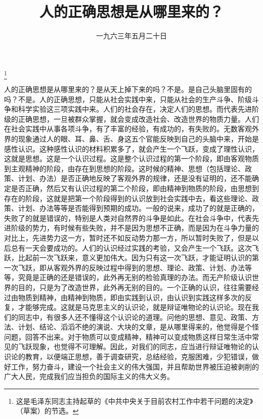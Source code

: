 
\title{人的正确思想是从哪里来的？}
\date{一九六三年五月二十日}
\thanks{这是毛泽东同志主持起草的《中共中央关于目前农村工作中若干问题的决定》（草案）的节选。}
\maketitle


人的正确思想是从哪里来的？是从天上掉下来的吗？不是。是自己头脑里固有的吗？不是。人的正确思想，只能从社会实践中来，只能从社会的生产斗争、阶级斗争和科学实验这三项实践中来。人们的社会存在，决定人们的思想。而代表先进阶级的正确思想，一旦被群众掌握，就会变成改造社会、改造世界的物质力量。人们在社会实践中从事各项斗争，有了丰富的经验，有成功的，有失败的。无数客观外界的现象通过人的眼、耳、鼻、舌、身这五个官能反映到自己的头脑中来，开始是感性认识。这种感性认识的材料积累多了，就会产生一个飞跃，变成了理性认识，这就是思想。这是一个认识过程。这是整个认识过程的第一个阶段，即由客观物质到主观精神的阶段，由存在到思想的阶段。这时候的精神、思想（包括理论、政策、计划、办法）是否正确地反映了客观外界的规律，还是没有证明的，还不能确定是否正确，然后又有认识过程的第二个阶段，即由精神到物质的阶段，由思想到存在的阶段，这就是把第一个阶段得到的认识放到社会实践中去，看这些理论、政策、计划、办法等等是否能得到预期的成功。一般的说来，成功了的就是正确的，失败了的就是错误的，特别是人类对自然界的斗争是如此。在社会斗争中，代表先进阶级的势力，有时候有些失败，并不是因为思想不正确，而是因为在斗争力量的对比上，先进势力这一方，暂时还不如反动势力那一方，所以暂时失败了，但是以后总有一天会要成功的。人们的认识经过实践的考验，又会产生一个飞跃。这次飞跃，比起前一次飞跃来，意义更加伟大。因为只有这一次飞跃，才能证明认识的第一次飞跃，即从客观外界的反映过程中得到的思想、理论、政策、计划、办法等等，究竟是正确的还是错误的，此外再无别的检验真理的办法。而无产阶级认识世界的目的，只是为了改造世界，此外再无别的目的。一个正确的认识，往往需要经过由物质到精神，由精神到物质，即由实践到认识，由认识到实践这样多次的反复，才能够完成。这就是马克思主义的认识论，就是辩证唯物论的认识论。现在我们的同志中，有很多人还不懂得这个认识论的道理。问他的思想、意见、政策、方法、计划、结论、滔滔不绝的演说、大块的文章，是从哪里得来的，他觉得是个怪问题，回答不出来。对于物质可以变成精神，精神可以变成物质这样日常生活中常见的飞跃现象，也觉得不可理解。因此，对我们的同志，应当进行辩证唯物论的认识论的教育，以便端正思想，善于调查研究，总结经验，克服困难，少犯错误，做好工作，努力奋斗，建设一个社会主义的伟大强国，并且帮助世界被压迫被剥削的广大人民，完成我们应当担负的国际主义的伟大义务。
